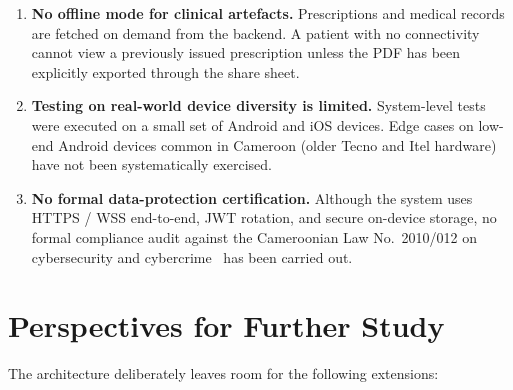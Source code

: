 \begin{enumerate}
  \item \textbf{No offline mode for clinical artefacts.} Prescriptions and medical records are fetched on demand from the backend. A patient with no connectivity cannot view a previously issued prescription unless the PDF has been explicitly exported through the share sheet.

  \item \textbf{Testing on real-world device diversity is limited.} System-level tests were executed on a small set of Android and iOS devices. Edge cases on low-end Android devices common in Cameroon (older Tecno and Itel hardware) have not been systematically exercised.

  \item \textbf{No formal data-protection certification.} Although the system uses HTTPS / WSS end-to-end, JWT rotation, and secure on-device storage, no formal compliance audit against the Cameroonian Law No.~2010/012 on cybersecurity and cybercrime~\cite{cameroon_law_2010_012} has been carried out.
\end{enumerate}

\section{Perspectives for Further Study}

The architecture deliberately leaves room for the following extensions:

